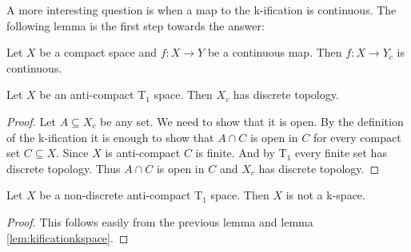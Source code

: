 A more interesting question is when a map to the k-ification is continuous. The following lemma is the first step towards the answer:

\begin{lem}
    Let $X$ be a compact space and $f \colon X \to Y$ be a continuous map. 
    Then $f \colon X \to Y_c$ is continuous.
\end{lem}

\begin{lem}
    Let $X$ be an anti-compact T$_1$ space.
    Then $X_c$ has discrete topology.
\end{lem}
\begin{proof}
    Let $A \subseteq X_c$ be any set. We need to show that it is open. 
    By the definition of the k-ification it is enough to show that $A \cap C$
    is open in $C$ for every compact set $C \subseteq X$. 
    Since $X$ is anti-compact $C$ is finite.
    And by T$_1$ every finite set has discrete topology. 
    Thus $A \cap C$ is open in $C$ and $X_c$ has discrete topology.
\end{proof}

\begin{cor}
    Let $X$ be a non-discrete anti-compact T$_1$ space.
    Then $X$ is not a k-space.
\end{cor}
\begin{proof}
    This follows easily from the previous lemma and lemma \ref{lem:kificationkspace}.
\end{proof}